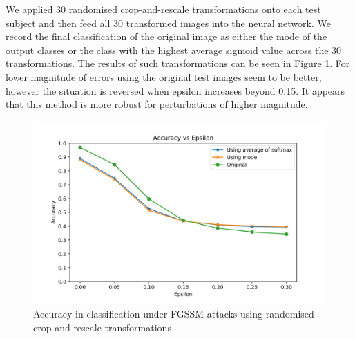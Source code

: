 We applied 30 randomised crop-and-rescale transformations onto each test subject and then feed all 30 transformed images into the neural network. We record the final classification of the original image as either the mode of the output classes or the class with the highest average sigmoid value across the 30 transformations. The results of such transformations can be seen in Figure \ref{fig:rand}. For lower magnitude of errors using the original test images seem to be better, however the situation is reversed when epsilon increases beyond 0.15. It appears that this method is more robust for perturbations of higher magnitude.

\begin{figure}[h!]
\includegraphics[width=\textwidth]{sgd_random}
		\caption{Accuracy in classification under FGSSM attacks using randomised crop-and-rescale transformations}
		\label{fig:rand}


\end{figure}
